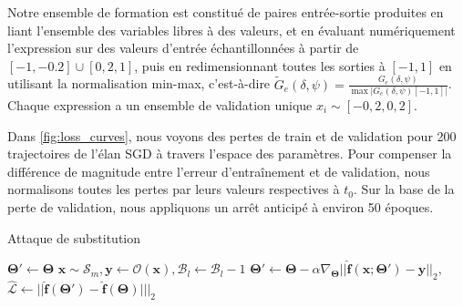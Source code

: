 Notre ensemble de formation est constitué de paires entrée-sortie produites en liant l'ensemble des variables libres à des valeurs, et en évaluant numériquement l'expression sur des valeurs d'entrée échantillonnées à partir de $[-1, -0. 2] \cup [0,2, 1]$, puis en redimensionnant toutes les sorties à $[-1, 1]$ en utilisant la normalisation min-max, c'est-à-dire $\tilde{G}_e(\delta, \psi)= \frac{G_e(\delta, \psi)}{\max |G_e(\delta, \psi)[-1, 1]|}$. Chaque expression a un ensemble de validation unique $x_i \sim [-0,2, 0,2]$.

Dans \autoref{fig:loss_curves}, nous voyons des pertes de train et de validation pour 200 trajectoires de l'élan SGD à travers l'espace des paramètres. Pour compenser la différence de magnitude entre l'erreur d'entraînement et de validation, nous normalisons toutes les pertes par leurs valeurs respectives à $t_0$. Sur la base de la perte de validation, nous appliquons un arrêt anticipé à environ 50 époques.

\begin{algorithm}[ht]
\caption{Attaque de substitution}
\label{alg:surrogate_attack}
\begin{algorithmic}[1]
\State $\bm\Theta' \gets \bm\Theta$
\Do
    \State $\mathbf{x} \sim \mathcal S_m, \mathbf{y} \gets \mathcal{O}(\mathbf{x}), \mathcal{B}_l \gets \mathcal{B}_l - 1$ 
    \State $\bm\Theta' \gets \bm\Theta - \alpha\nabla_{\bm\Theta}||\mathbf{\hat f}(\mathbf{x}; \bm\Theta') - \mathbf{y}||_2,$ 
 
\State $\mathcal{\hat{L}} \gets ||\mathbf{\hat f}(\bm\Theta') - \mathbf{\hat f}(\bm\Theta)|||_2$ 
\State \Return {}
\EndProcedure
\end{algorithmic}
\end{algorithm}

